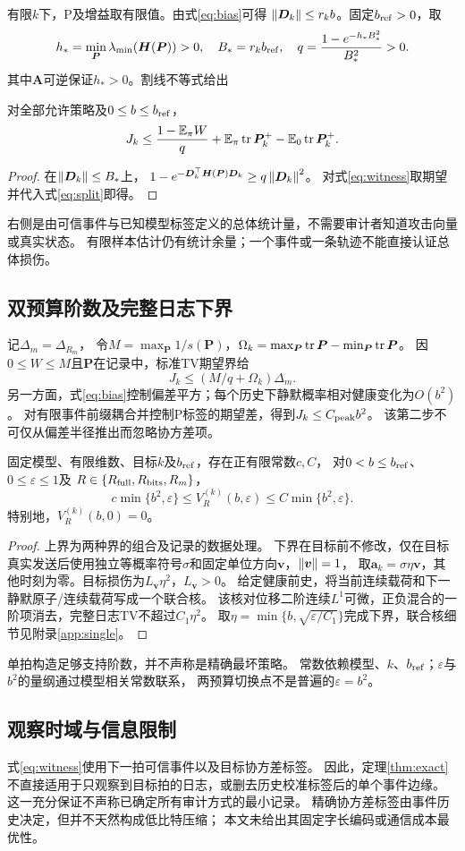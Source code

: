 有限$k$下，P及增益取有限值。由式\eqref{eq:bias}可得
$\left\|{\bm{D}}_k\right\|\le r_kb$。固定$b_{\rm ref}>0$，取
\[
h_*=\min_{\bm{P}}\lambda_{\min}({\bm{H}}({\bm{P}}))>0,\quad
B_*=r_kb_{\rm ref},\quad q=\frac{1-e^{-h_*B_*^2}}{B_*^2}>0.
\]
其中${\bm{A}}$可逆保证$h_*>0$。割线不等式给出
\begin{proposition}[可信下一事件的总体损伤证书]
对全部允许策略及$0\le b\le b_{\rm ref}$，
\begin{equation}
J_k\le \frac{1-\mathbb E_\pi W}{q}
+\mathbb E_\pi\operatorname{tr} {\bm{P}}_k^+-\mathbb E_0\operatorname{tr} {\bm{P}}_k^+.
\label{eq:certificate}
\end{equation}
\end{proposition}
\begin{proof}
在$\left\|{\bm{D}}_k\right\|\le B_*$上，
$1-e^{-{\bm{D}}_k^\top {\bm{H}}({\bm{P}}){\bm{D}}_k}\ge q\left\|{\bm{D}}_k\right\|^2$。
对式\eqref{eq:witness}取期望并代入式\eqref{eq:split}即得。
\end{proof}
右侧是由可信事件与已知模型标签定义的总体统计量，不需要审计者知道攻击向量或真实状态。
有限样本估计仍有统计余量；一个事件或一条轨迹不能直接认证总体损伤。

\subsection{双预算阶数及完整日志下界}
记$\Delta_m=\Delta_{R_m}$，
令$M=\max_{\bm{P}}1/s({\bm{P}})$，$\Omega_k=\max_{\bm{P}}\operatorname{tr} {\bm{P}}-\min_{\bm{P}}\operatorname{tr} {\bm{P}}$。
因$0\le W\le M$且${\bm{P}}$在记录中，标准TV期望界给
\[
J_k\le(M/q+\Omega_k)\Delta_m.
\]
另一方面，式\eqref{eq:bias}控制偏差平方；每个历史下静默概率相对健康变化为$O(b^2)$。
对有限事件前缀耦合并控制P标签的期望差，得到$J_k\le C_{\rm peak}b^2$。
该第二步不可仅从偏差半径推出而忽略协方差项。

\begin{theorem}[精确反馈的有限时域损伤阶数]
\label{thm:exact}
固定模型、有限维数、目标$k$及$b_{\rm ref}$，存在正有限常数$c,C$，
对$0<b\le b_{\rm ref}$、$0\le\varepsilon\le1$及
$R\in\{R_{\rm full},R_{\rm bits},R_m\}$，
\begin{equation}
c\min\{b^2,\varepsilon\}\le V_R^{(k)}(b,\varepsilon)
\le C\min\{b^2,\varepsilon\}.
\label{eq:exact-bound}
\end{equation}
特别地，$V_R^{(k)}(b,0)=0$。
\end{theorem}
\begin{proof}
上界为两种界的组合及记录的数据处理。
下界在目标前不修改，仅在目标真实发送后使用独立等概率符号$\sigma$和固定单位方向${\bm{v}}$，$\left\|\bm{v}\right\|=1$，
取${\bm{a}}_k=\sigma\eta {\bm{v}}$，其他时刻为零。目标损伤为$L_{\bm{v}}\eta^2$，$L_{\bm{v}}>0$。
给定健康前史，将当前连续载荷和下一静默原子/连续载荷写成一个联合核。
该核对位移二阶连续$L^1$可微，正负混合的一阶项消去，完整日志TV不超过$C_1\eta^2$。
取$\eta=\min\{b,\sqrt{\varepsilon/C_1}\}$完成下界，联合核细节见附录\ref{app:single}。
\end{proof}
单拍构造足够支持阶数，并不声称是精确最坏策略。
常数依赖模型、$k$、$b_{\rm ref}$；$\varepsilon$与$b^2$的量纲通过模型相关常数联系，
两预算切换点不是普遍的$\varepsilon=b^2$。

\subsection{观察时域与信息限制}
式\eqref{eq:witness}使用下一拍可信事件以及目标协方差标签。
因此，定理\ref{thm:exact}不直接适用于只观察到目标拍的日志，或删去历史校准标签后的单个事件边缘。
这一充分保证不声称已确定所有审计方式的最小记录。
精确协方差标签由事件历史决定，但并不天然构成低比特压缩；
本文未给出其固定字长编码或通信成本最优性。
